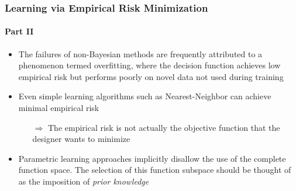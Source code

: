 \documentclass[aspectratio=169,usenames,dvipsnames]{beamer}
\begin{document}
\begin{frame}
\frametitle{Learning via Empirical Risk Minimization}
\framesubtitle{Part II}

\begin{itemize}
\item The failures of non-Bayesian methods are frequently attributed to a phenomenon termed \alert{overfitting}, where the decision function achieves low empirical risk but performs poorly on novel data not used during training
\vspace{0.5em}
\item Even simple learning algorithms such as Nearest-Neighbor  can achieve minimal empirical risk
	\vspace{0.25em}
	\begin{itemize}
	\item[$\Rightarrow$] \alert{The empirical risk is not actually the objective function that the designer wants to minimize}
	\end{itemize}
\vspace{0.5em}
\item Parametric learning approaches implicitly disallow the use of the complete function space. The selection of this function subspace should be thought of as the imposition of \emph{prior knowledge}

\end{itemize}


\end{frame}
\end{document}
